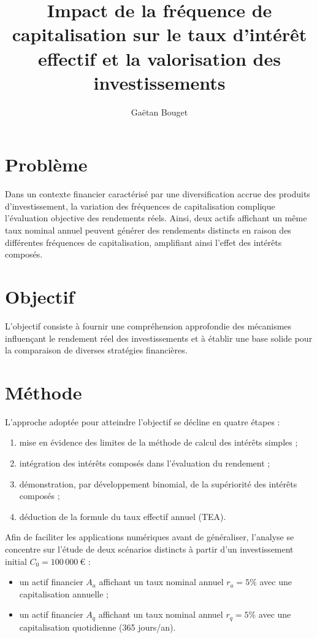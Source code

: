 \documentclass{article}
\title{Impact de la fréquence de capitalisation sur le taux d'intérêt effectif et la valorisation des investissements}
\author{Gaëtan Bouget}
\begin{document}
\maketitle

\section{Problème}
Dans un contexte financier caractérisé par une diversification accrue des produits d’investissement, la variation des fréquences de capitalisation complique l’évaluation objective des rendements réels. Ainsi, deux actifs affichant un même taux nominal annuel peuvent générer des rendements distincts en raison des différentes fréquences de capitalisation, amplifiant ainsi l'effet des intérêts composés.

\section{Objectif}
L'objectif consiste à fournir une compréhension approfondie des mécanismes influençant le rendement réel des investissements et à établir une base solide pour la comparaison de diverses stratégies financières.

\section{Méthode}
L'approche adoptée pour atteindre l'objectif se décline en quatre étapes :
\begin{enumerate}
    \item mise en évidence des limites de la méthode de calcul des intérêts simples ;
    \item intégration des intérêts composés dans l'évaluation du rendement ; 
    \item démonstration, par développement binomial, de la supériorité des intérêts composés ;
    \item déduction de la formule du taux effectif annuel (TEA).
\end{enumerate}

Afin de faciliter les applications numériques avant de généraliser, l'analyse se concentre sur l'étude de deux scénarios distincts à partir d'un investissement initial \( C_0 = 100\,000\ \text{€} \) :
\begin{itemize}
    \item un actif financier \( A_a \) affichant un taux nominal annuel \( r_a = 5\% \) avec une capitalisation annuelle ;
    \item un actif financier \( A_q \) affichant un taux nominal annuel \( r_q = 5\% \) avec une capitalisation quotidienne (365 jours/an).
\end{itemize}
\end{document}
